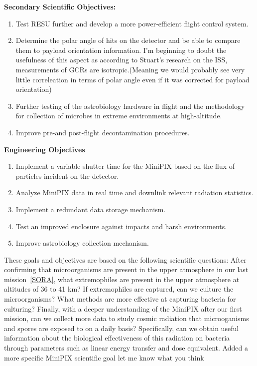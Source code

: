 {\bf Secondary Scientific Objectives:}
	\begin{enumerate}
	\item Test RESU further and develop a more power-efficient flight control system.
	\item Determine the polar angle of hits on the detector and be able to compare them to payload orientation information.
	 {I'm beginning to doubt the usefulness of this aspect as according to Stuart's research on the ISS, measurements of GCRs are isotropic.(Meaning we would probably see very little correleation in terms of polar angle even if it was corrected for payload orientation)}
	\item Further testing of the astrobiology hardware in flight and the methodology for collection of microbes in extreme environments at high-altitude.
	\item Improve pre-and post-flight decontamination procedures.
	\end{enumerate}


{\bf Engineering Objectives}
	\begin{enumerate}
	\item Implement a variable shutter time for the MiniPIX based on the flux of particles incident on the detector.
	\item Analyze MiniPIX data in real time and downlink relevant radiation statistics.
	\item Implement a redundant data storage mechanism.
	\item Test an improved enclosure against impacts and harsh environments.
	\item Improve astrobiology collection mechanism.
	\end{enumerate}

These goals and objectives are based on the following scientific questions: After confirming that microorganisms are present in the upper atmosphere in our last mission~\ref{SORA}, what extremophiles are present in the upper atmosphere at altitudes of 36 to 41 km?  If extremophiles are captured, can we culture the microorganisms?  What methods are more effective at capturing bacteria for culturing? Finally, with a deeper understanding of the MiniPIX after our first mission, can we collect more data to study cosmic radiation that microoganisms and spores are exposed to on a daily basis? Specifically, can we obtain useful information about the biological effectiveness of this radiation on bacteria through parameters such as linear energy transfer and dose equivalent. 
 {Added a more specific MiniPIX scientific goal let me know what you think}

